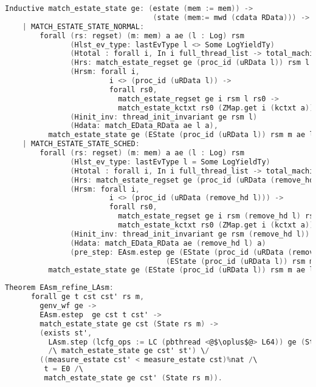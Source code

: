 \begin{lstlisting}[language=C]
    Inductive match_estate_state ge: (estate (mem := mem)) -> 
                                  (state (mem:= mwd (cdata RData))) -> Prop :=
    | MATCH_ESTATE_STATE_NORMAL:
        forall (rs: regset) (m: mem) a ae (l : Log) rsm
               (Hlst_ev_type: lastEvType l <> Some LogYieldTy)
               (Htotal : forall i, In i full_thread_list -> total_machine_regset i rsm)
               (Hrs: match_estate_regset ge (proc_id (uRData l)) rsm l rs) (* my regset *)
               (Hrsm: forall i,
                        i <> (proc_id (uRData l)) ->
                        forall rs0,
                          match_estate_regset ge i rsm l rs0 ->
                          match_estate_kctxt rs0 (ZMap.get i (kctxt a))) (* others<@$'$@> regset will be remained as same *)
               (Hinit_inv: thread_init_invariant ge rsm l)
               (Hdata: match_EData_RData ae l a), 
          match_estate_state ge (EState (proc_id (uRData l)) rsm m ae l) (State rs (m, a))
    | MATCH_ESTATE_STATE_SCHED:
        forall (rs: regset) (m: mem) a ae (l : Log) rsm
               (Hlst_ev_type: lastEvType l = Some LogYieldTy)
               (Htotal : forall i, In i full_thread_list -> total_machine_regset i rsm)
               (Hrs: match_estate_regset ge (proc_id (uRData (remove_hd l))) rsm (remove_hd l) rs) (* my regset *)
               (Hrsm: forall i,
                        i <> (proc_id (uRData (remove_hd l))) ->
                        forall rs0,
                          match_estate_regset ge i rsm (remove_hd l) rs0 ->
                          match_estate_kctxt rs0 (ZMap.get i (kctxt a))) (* others<@$'$@> regset will be remained as same *)
               (Hinit_inv: thread_init_invariant ge rsm (remove_hd l))
               (Hdata: match_EData_RData ae (remove_hd l) a)
               (pre_step: EAsm.estep ge (EState (proc_id (uRData (remove_hd l))) rsm m ae (remove_hd l)) E0
                                     (EState (proc_id (uRData l)) rsm m ae l)),
          match_estate_state ge (EState (proc_id (uRData l)) rsm m ae l) (State rs (m, a)).
\end{lstlisting}


\begin{lstlisting}[language=C]
    Theorem EAsm_refine_LAsm:
      forall ge t cst cst' rs m, 
        genv_wf ge ->
        EAsm.estep  ge cst t cst' -> 
        match_estate_state ge cst (State rs m) ->
        (exists st',
          LAsm.step (lcfg_ops := LC (pbthread <@$\oplus$@> L64)) ge (State rs m) t st'
          /\ match_estate_state ge cst' st') \/
        ((measure_estate cst' < measure_estate cst)%nat /\
         t = E0 /\
         match_estate_state ge cst' (State rs m)).
\end{lstlisting}

